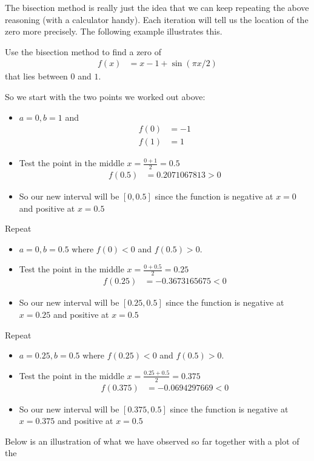 The bisection method is really just the idea that we can keep repeating the above
reasoning (with a calculator handy). Each iteration will tell us the location of the zero
more precisely. The following example illustrates this.
\begin{eg}\label{eg bisection}
 Use the bisection method to find a zero of
\begin{align*}
  f(x) &= x-1+\sin(\pi x/2)
\end{align*}
that lies between $0$ and $1$.

So we start with the two points we worked out above:
\begin{itemize}
 \item $a=0, b=1$ and
\begin{align*}
  f(0) &= -1\\
  f(1) &= 1
\end{align*}
 \item Test the point in the middle $x = \frac{0+1}{2} = 0.5$
\begin{align*}
  f(0.5) &= 0.2071067813 > 0
\end{align*}
\item So our new interval will be $[0,0.5]$ since the function is negative at
$x=0$ and positive at $x=0.5$
\end{itemize}
Repeat
\begin{itemize}
 \item $a=0, b=0.5$ where $f(0)<0$ and $f(0.5)>0$.
 \item Test the point in the middle $x = \frac{0+0.5}{2} = 0.25$
\begin{align*}
  f(0.25) &= -0.3673165675 < 0
\end{align*}
\item So our new interval will be $[0.25,0.5]$ since the function is negative
at $x=0.25$ and positive at $x=0.5$
\end{itemize}
Repeat
\begin{itemize}
 \item $a=0.25, b=0.5$ where $f(0.25)<0$ and $f(0.5)>0$.
 \item Test the point in the middle $x = \frac{0.25+0.5}{2} = 0.375$
\begin{align*}
  f(0.375) &= -0.0694297669 < 0
\end{align*}
\item So our new interval will be $[0.375,0.5]$ since the function is negative
at $x=0.375$ and positive at $x=0.5$
\end{itemize}
Below is an illustration of what we have observed so far together with a plot of the

\end{eg}

